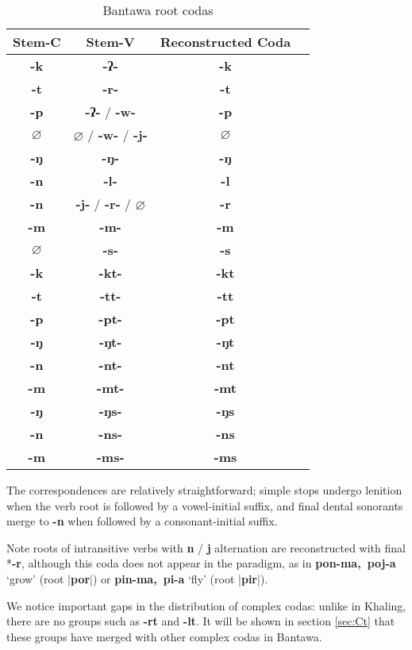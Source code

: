\documentclass[oneside,a4paper,11pt]{article}
\newcommand{\ipa}[1]{\textbf{{\phon\mbox{#1}}}} %
\begin{document}
\begin{table}[h]
\caption{Bantawa root codas} \centering \label{tab:bantawa.root}
\begin{tabular}{cccc}
\toprule
Stem-C & Stem-V & Reconstructed Coda \\
\midrule
\ipa{-k} & \ipa{-ʔ-} & \ipa{-k} \\
\ipa{-t} & \ipa{-r-} & \ipa{-t} \\
\ipa{-p} & \ipa{-ʔ-} /  \ipa{-w-} & \ipa{-p} \\
$\varnothing$ & $\varnothing$ / \ipa{-w-} / \ipa{-j-} & $\varnothing$ \\
\ipa{-ŋ} & \ipa{-ŋ-} & \ipa{-ŋ} \\
\ipa{-n} & \ipa{-l-} & \ipa{-l} \\
\ipa{-n} & \ipa{-j-} / \ipa{-r-} / $\varnothing$ & \ipa{-r} \\
\ipa{-m} & \ipa{-m-} & \ipa{-m} \\
$\varnothing$ & \ipa{-s-} & \ipa{-s} \\
\midrule
\ipa{-k} & \ipa{-kt-} & \ipa{-kt} \\
\ipa{-t} & \ipa{-tt-} & \ipa{-tt} \\
\ipa{-p} & \ipa{-pt-} & \ipa{-pt} \\
\ipa{-ŋ} & \ipa{-ŋt-} & \ipa{-ŋt} \\
\ipa{-n} & \ipa{-nt-} & \ipa{-nt} \\
\ipa{-m} & \ipa{-mt-} & \ipa{-mt} \\
\midrule
\ipa{-ŋ} & \ipa{-ŋs-} & \ipa{-ŋs}  \\
\ipa{-n} & \ipa{-ns-} & \ipa{-ns} \\
\ipa{-m} & \ipa{-ms-} & \ipa{-ms}   \\
\bottomrule
\end{tabular}
\end{table}

The correspondences are relatively straightforward; simple stops undergo lenition when the verb root is followed by a vowel-initial suffix, and final dental sonorants merge to \ipa{-n} when followed by a consonant-initial suffix. 

Note roots of intransitive verbs with \ipa{n} / \ipa{j} alternation are reconstructed with final *\ipa{-r}, although this coda does not appear in the paradigm, as in \ipa{pon-ma, poj-a} `grow' (root |\ipa{por}|) or \ipa{pin-ma, pi-a} `fly' (root |\ipa{pir}|).

We notice important gaps in the distribution of complex codas: unlike in Khaling, there are no groups such as \ipa{-rt} and \ipa{-lt}. It will be shown in section \ref{sec:Ct} that these groups have merged with other complex codas in Bantawa.
\end{document}
